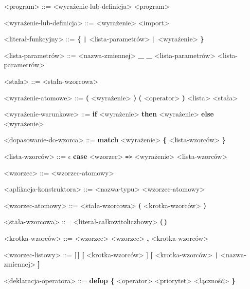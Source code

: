 \documentclass[12pt]{article}
\begin{document}
\begin{grammar}

<program> ::=
    <wyrażenie-lub-definicja>
     <program>

<wyrażenie-lub-definicja> ::=
    <wyrażenie>
    \alt <import>



<literał-funkcyjny> ::=
    \textbf{\{} \texttt{|} <lista-parametrów> \texttt{|} <wyrażenie> \textbf{\}}

<lista-parametrów> ::=
    <nazwa-zmiennej>
    \alt \textbf{_}
    \alt \textbf{_} <lista-parametrów>
     <lista-parametrów>

<stała> ::=
    <stała-wzorcowa>

<wyrażenie-atomowe> ::=
    \textbf{(} <wyrażenie> \textbf{)}
    \alt \textbf{(} <operator> \textbf{)}
    \alt <lista>
    \alt <stała>

<wyrażenie-warunkowe> ::=
    \textbf{if} <wyrażenie>
    \textbf{then} <wyrażenie>
    \textbf{else} <wyrażenie> 

<dopasowanie-do-wzorca> ::=
    \textbf{match} <wyrażenie> \textbf{\{}
    <lista-wzorców> \textbf{\}}

<lista-wzorców> ::= $\epsilon$
    \alt \textbf{case} <wzorzec> \texttt{=>} <wyrażenie> <lista-wzorców>

<wzorzec> ::=
    <wzorzec-atomowy>

<aplikacja-konstruktora> ::=
    <nazwa-typu> <wzorzec-atomowy>

<wzorzec-atomowy> ::=
    <stała-wzorcowa>
    \alt \textbf{(} <krotka-wzorców> \textbf{)}

<stała-wzorcowa> ::=
    <literał-całkowitoliczbowy>
    \alt \textbf{(\,)}

<krotka-wzorców> ::=
    <wzorzec>
    \alt <wzorzec> \textbf{,} <krotka-wzorców>

<wzorzec-listowy> ::=
    \textbf{[\,]}
    \alt \textbf{[} <krotka-wzorców> \textbf{]}
    \alt \textbf{[} <krotka-wzorców> \texttt{|} <nazwa-zmiennej> \textbf{]}

<deklaracja-operatora> ::=
    \textbf{defop \{} <operator> <priorytet> <łączność> \textbf{\}}


\end{grammar}
\end{document}
